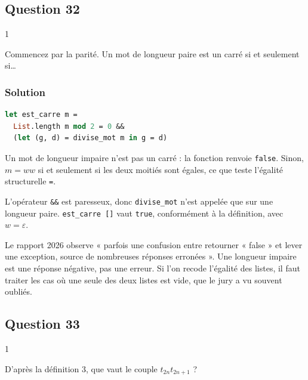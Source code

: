 \documentclass[11pt,a4paper]{article}
\begin{document}
\hypertarget{question-32}{%
\subsection{Question 32}\label{question-32}}

\begin{indication}{1}

Commencez par la parité. Un mot de longueur paire est un carré si et seulement si\ldots{}

\end{indication}

\hypertarget{solution-31}{%
\subsubsection{Solution}\label{solution-31}}

\begin{lstlisting}[language=Caml]
let est_carre m =
  List.length m mod 2 = 0 &&
  (let (g, d) = divise_mot m in g = d)
\end{lstlisting}

Un mot de longueur impaire n'est pas un carré : la fonction renvoie \texttt{false}. Sinon, \(m=ww\) si et seulement si les deux moitiés sont égales, ce que teste l'égalité structurelle \texttt{=}.

L'opérateur \texttt{\&\&} est paresseux, donc \texttt{divise\_mot} n'est appelée que sur une longueur paire. \texttt{est\_carre\ {[}{]}} vaut \texttt{true}, conformément à la définition, avec \(w=\varepsilon\).

\begin{piege}

Le rapport 2026 observe « parfois une confusion entre retourner « false » et lever une exception, source de nombreuses réponses erronées ». Une longueur impaire est une réponse négative, pas une erreur. Si l'on recode l'égalité des listes, il faut traiter les cas où une seule des deux listes est vide, que le jury a vu souvent oubliés.

\end{piege}

\hypertarget{question-33}{%
\subsection{Question 33}\label{question-33}}

\begin{indication}{1}

D'après la définition 3, que vaut le couple \(t_{2n}t_{2n+1}\) ?

\end{indication}
\end{document}
